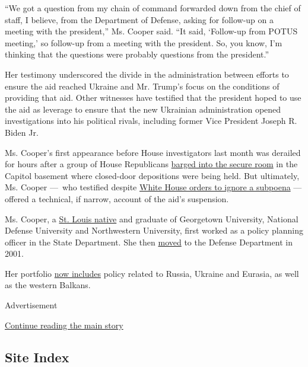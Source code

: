 ``We got a question from my chain of command forwarded down from the
chief of staff, I believe, from the Department of Defense, asking for
follow-up on a meeting with the president,'' Ms. Cooper said. ``It said,
`Follow-up from POTUS meeting,' so follow-up from a meeting with the
president. So, you know, I'm thinking that the questions were probably
questions from the president.''

Her testimony underscored the divide in the administration between
efforts to ensure the aid reached Ukraine and Mr. Trump's focus on the
conditions of providing that aid. Other witnesses have testified that
the president hoped to use the aid as leverage to ensure that the new
Ukrainian administration opened investigations into his political
rivals, including former Vice President Joseph R. Biden Jr.

Ms. Cooper's first appearance before House investigators last month was
derailed for hours after a group of House Republicans
\href{https://www.nytimes.com/2019/10/23/us/politics/republicans-storm-trump-impeachment-hearing.html?searchResultPosition=3}{barged
into the secure room} in the Capitol basement where closed-door
depositions were being held. But ultimately, Ms. Cooper ---~who
testified despite
\href{https://www.nytimes.com/2019/10/24/us/politics/laura-cooper-pentagon-letter.html?searchResultPosition=2}{White
House orders to ignore a subpoena} --- offered a technical, if narrow,
account of the aid's suspension.

Ms. Cooper, a
\href{https://www.stltoday.com/news/local/columns/joe-holleman/laura-cooper-witness-in-trump-impeachment-inquiry-is-stl-native/article_bccfcd07-4a3f-5e91-953c-b0f690fdd5fc.html}{St.
Louis native} and graduate of Georgetown University, National Defense
University and Northwestern University, first worked as a policy
planning officer in the State Department. She then
\href{https://www.defense.gov/Our-Story/Biographies/Biography/Article/1568391/laura-k-cooper/}{moved}
to the Defense Department in 2001.

Her portfolio
\href{https://www.defense.gov/Our-Story/Biographies/Biography/Article/1568391/laura-k-cooper/}{now
includes} policy related to Russia, Ukraine and Eurasia, as well as the
western Balkans.

Advertisement

\protect\hyperlink{after-bottom}{Continue reading the main story}

\hypertarget{site-index}{%
\subsection{Site Index}\label{site-index}}

